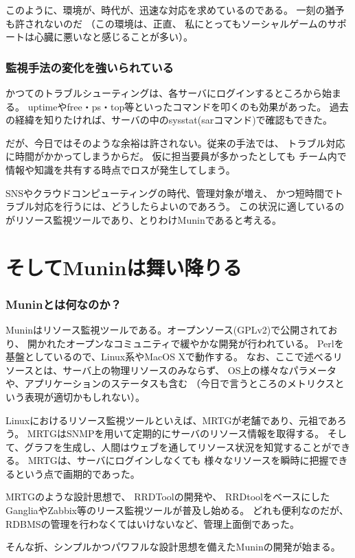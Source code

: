 このように、環境が、時代が、迅速な対応を求めているのである。
一刻の猶予も許されないのだ
（この環境は、正直、
私にとってもソーシャルゲームのサポートは心臓に悪いなと感じることが多い）。

\subsubsection{監視手法の変化を強いられている}
かつてのトラブルシューティングは、各サーバにログインするところから始まる。
uptimeやfree・ps・top等といったコマンドを叩くのも効果があった。
過去の経緯を知りたければ、サーバの中のsysstat(sarコマンド)で確認もできた。

だが、今日ではそのような余裕は許されない。従来の手法では、
トラブル対応に時間がかかってしまうからだ。
仮に担当要員が多かったとしても
チーム内で情報や知識を共有する時点でロスが発生してしまう。

SNSやクラウドコンピューティングの時代、管理対象が増え、
かつ短時間でトラブル対応を行うには、どうしたらよいのであろう。
この状況に適しているのがリソース監視ツールであり、とりわけMuninであると考える。

\section{そしてMuninは舞い降りる}
\subsubsection{Muninとは何なのか？}
Muninはリソース監視ツールである。オープンソース(GPLv2)で公開されており、
開かれたオープンなコミュニティで緩やかな開発が行われている。
Perlを基盤としているので、Linux系やMacOS Xで動作する。
なお、ここで述べるリソースとは、サーバ上の物理リソースのみならず、
OS上の様々なパラメータや、アプリケーションのステータスも含む
（今日で言うところのメトリクスという表現が適切かもしれない）。

Linuxにおけるリソース監視ツールといえば、MRTGが老舗であり、元祖であろう。
MRTGはSNMPを用いて定期的にサーバのリソース情報を取得する。
そして、グラフを生成し、人間はウェブを通してリソース状況を知覚することができる。
MRTGは、サーバにログインしなくても
様々なリソースを瞬時に把握できるという点で画期的であった。

MRTGのような設計思想で、
RRDToolの開発や、
RRDtoolをベースにしたGangliaやZabbix等のリース監視ツールが普及し始める。
どれも便利なのだが、RDBMSの管理を行わなくてはいけないなど、管理上面倒であった。

そんな折、シンプルかつパワフルな設計思想を備えたMuninの開発が始まる。

